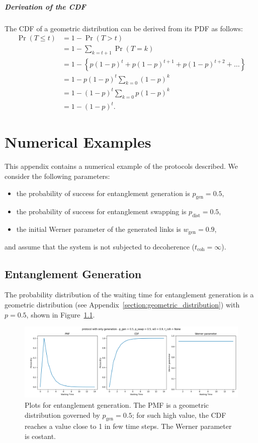 \documentclass{masterthesis}
\begin{document}
\paragraph*{Derivation of the CDF}
The CDF of a geometric distribution can be derived from its PDF as follows:
\begin{align*}
    \Pr(T \leq t) &= 1 - \Pr(T > t) \\
    &= 1 - \sum_{k=t+1} \Pr(T = k) \\
    &= 1 - \left\{p (1 - p)^t + p (1 - p)^{t+1} + p (1 - p)^{t+2} + \ldots\right\} \\
    &= 1 - p (1 - p)^t \sum_{k=0} (1 - p)^k \\
    &= 1 - (1 - p)^t \sum_{k=0} p (1 - p)^k \\
    &= 1 - (1 - p)^t.
\end{align*} %

\chapter{Numerical Examples}\label{app:numerical_examples}
This appendix contains a numerical example of the protocols described. We consider the following parameters:
\begin{itemize}
    \item the probability of success for entanglement generation is $p_{\text{gen}} = 0.5$,
    \item the probability of success for entanglement swapping is $p_{\text{dist}} = 0.5$,
    \item the initial Werner parameter of the generated links is $w_{\text{gen}} = 0.9$,
\end{itemize}
and assume that the system is not subjected to decoherence ($t_\text{coh} = \infty$).

\section{Entanglement Generation}\label{section:entanglement_generation_numerical_example}

The probability distribution of the waiting time for entanglement generation is a geometric distribution (see Appendix~\ref{section:geometric_distribution}) with $p = 0.5$, shown in Figure~\ref{fig:gen_waiting_time}.
\begin{figure}[ht]
    \centering
    \includegraphics[width=1\linewidth]{images/dist_tests/only generation.png}
    \caption{Plots for entanglement generation. The PMF is a geometric distribution governed by $p_\text{gen} = 0.5$; for such high value, the CDF reaches a value close to 1 in few time steps. The Werner parameter is costant.}
    \label{fig:gen_waiting_time}
\end{figure}
\end{document}
